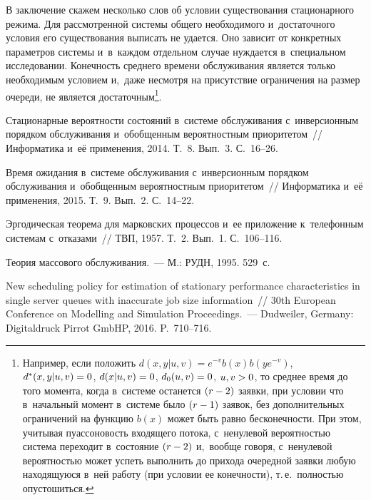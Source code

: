 \begin{multicols}{2}
В заключение скажем несколько слов об условии существования
стационарного режима.
Для рассмотренной системы общего необходимого и~достаточного
условия его существования выписать не удается.
Оно зависит от конкретных параметров
системы и~в~каждом отдельном случае нуждается в~специальном исследовании.
Конечность среднего времени обслуживания
является только необходимым условием
и,~даже несмотря на присутствие ограничения на размер очереди,
не является достаточным\footnote{Например,
если положить $d(x,y|u,v) = e^{-v} b(x)b(y e^{-v})$,
$d^*(x,y|u,v)\hm=0$, $d(x|u,v)\hm=0$, $d_0(u,v)\hm=0$, $u, v\hm>0$,
то среднее время до того момента, когда в~системе останется
$(r\hm-2)$ заявки, при условии что в~начальный момент в~системе
было $(r\hm-1)$ заявок, без дополнительных
ограничений на функцию $b(x)$ может быть равно бесконечности. При этом,
учитывая пуассоновость входящего потока,
с~ненулевой вероятностью система
переходит в~состояние $(r\hm-2)$
и,~вообще говоря, с~ненулевой вероятностью может успеть выполнить
до прихода очередной заявки
любую находящуюся в~ней работу (при условии ее конечности), т.\,е.\
полностью опустошиться.}.


{\small\frenchspacing
 {%
 \begin{thebibliography}{9}


Стационарные вероятности состояний в~системе обслуживания 
с~инверсионным порядком обслуживания и~обобщенным вероятностным
приоритетом~// Информатика и~её применения, 2014. Т.~8. Вып.~3.
С.~16--26.

Время ожидания в~системе обслуживания с~инверсионным порядком
обслуживания и~обобщенным вероятностным приоритетом~// Информатика 
и~её применения, 2015. Т.~9. Вып.~2. С.~14--22.


%


Эргодическая теорема для марковских процессов и~ее приложение 
к~телефонным системам с~отказами~// ТВП, 1957. Т.~2. Вып.~1. С.~106--116.

Теория массового обслуживания.~--- М.: РУДН, 1995. 529~с.

New scheduling policy for estimation of stationary performance
characteristics in single server queues with inaccurate job size
information~// 30th European Conference on Modelling and Simulation Proceedings.~--- 
Dudweiler, Germany: Digitaldruck Pirrot GmbHP, 2016. P.~710--716.




\end{thebibliography}}}
\end{multicols}
